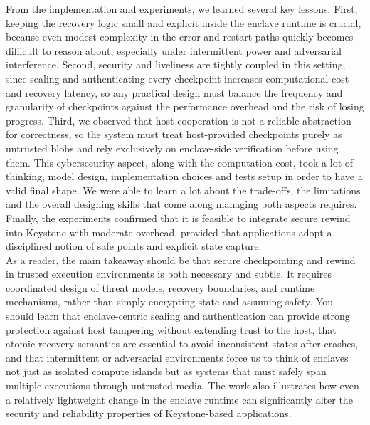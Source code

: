 \documentclass[11pt,a4paper]{report}
\begin{document}
From the implementation and experiments, we learned several key lessons.  
First, keeping the recovery logic small and explicit inside the enclave runtime is crucial, because even modest complexity in the error and restart paths quickly becomes difficult to reason about, especially under intermittent power and adversarial interference.  
Second, security and liveliness are tightly coupled in this setting, since sealing and authenticating every checkpoint increases computational cost and recovery latency, so any practical design must balance the frequency and granularity of checkpoints against the performance overhead and the risk of losing progress.  
Third, we observed that host cooperation is not a reliable abstraction for correctness, so the system must treat host-provided checkpoints purely as untrusted blobs and rely exclusively on enclave-side verification before using them.  
This cybersecurity aspect, along with the computation cost, took a lot of thinking, model design, implementation choices and tests setup in order to have a valid final shape. 
We were able to learn a lot about the trade-offs, the limitations and the overall designing skills that come along managing both aspects requires. 
Finally, the experiments confirmed that it is feasible to integrate secure rewind into Keystone with moderate overhead, provided that applications adopt a disciplined notion of safe points and explicit state capture.  
\\

As a reader, the main takeaway should be that secure checkpointing and rewind in trusted execution environments is both necessary and subtle.  
It requires coordinated design of threat models, recovery boundaries, and runtime mechanisms, rather than simply encrypting state and assuming safety.  
You should learn that enclave-centric sealing and authentication can provide strong protection against host tampering without extending trust to the host, that atomic recovery semantics are essential to avoid inconsistent states after crashes, and that intermittent or adversarial environments force us to think of enclaves not just as isolated compute islands but as systems that must safely span multiple executions through untrusted media.  
The work also illustrates how even a relatively lightweight change in the enclave runtime can significantly alter the security and reliability properties of Keystone-based applications.  
\\
\end{document}
